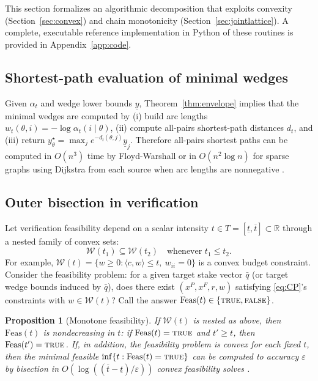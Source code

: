 \documentclass[final,3p,times]{elsarticle}
\theoremstyle{plain}
\newtheorem{proposition}{Proposition}
\theoremstyle{definition}
\newcommand{\R}{\mathbb{R}}
\newcommand{\1}{\mathbbm{1}}
\newcommand{\cW}{\mathcal{W}}
\begin{document}
This section formalizes an algorithmic decomposition that exploits convexity (Section~\ref{sec:convex}) and chain monotonicity (Section~\ref{sec:jointlattice}). A complete, executable reference implementation in Python of these routines is provided in Appendix~\ref{app:code}.

\subsection{Shortest-path evaluation of minimal wedges}

Given $\alpha_t$ and wedge lower bounds $\underline y$, Theorem~\ref{thm:envelope} implies that the minimal wedges are computed by (i) build arc lengths $w_t(\theta,i)=-\log\alpha_t(i\mid\theta)$, (ii) compute all-pairs shortest-path distances $d_t$, and (iii) return $y^\star_\theta=\max_j e^{-d_t(\theta,j)}\underline y_j$. Therefore all-pairs shortest paths can be computed in $O(n^3)$ time by Floyd-Warshall or in $O(n^2\log n)$ for sparse graphs using Dijkstra from each source when arc lengths are nonnegative \citep[Ch.~24]{CLRS2009}.

\subsection{Outer bisection in verification}

Let verification feasibility depend on a scalar intensity $t\in T=[\underline t,\overline t]\subset\R$ through a nested family of convex sets:
\[
\cW(t_1)\subseteq \cW(t_2)\quad \text{whenever } t_1\le t_2.
\]
For example, $\cW(t)=\{w\ge 0: \langle c,w\rangle\le t,\ w_{ii}=0\}$ is a convex budget constraint. Consider the feasibility problem: for a given target stake vector $\bar q$ (or target wedge bounds induced by $\bar q$), does there exist $(x^P,x^F,r,w)$ satisfying \eqref{eq:CP}'s constraints with $w\in\cW(t)$? Call the answer $\mathrm{Feas}(t)\in\{\textsc{true},\textsc{false}\}$.

\begin{proposition}[Monotone feasibility]\label{prop:monofeas}
If $\cW(t)$ is nested as above, then $\mathrm{Feas}(t)$ is nondecreasing in $t$: if $\mathrm{Feas}(t)=\textsc{true}$ and $t'\ge t$, then $\mathrm{Feas}(t')=\textsc{true}$. 
If, in addition, the feasibility problem is convex for each fixed $t$, then the minimal feasible $\inf\{t:\mathrm{Feas}(t)=\textsc{true}\}$ can be computed to accuracy $\varepsilon$ by bisection in $O(\log((\overline t-\underline t)/\varepsilon))$ convex feasibility solves \citep[Sec.~4.2.5]{BoydVandenberghe2004}.
\end{proposition}
\end{document}
